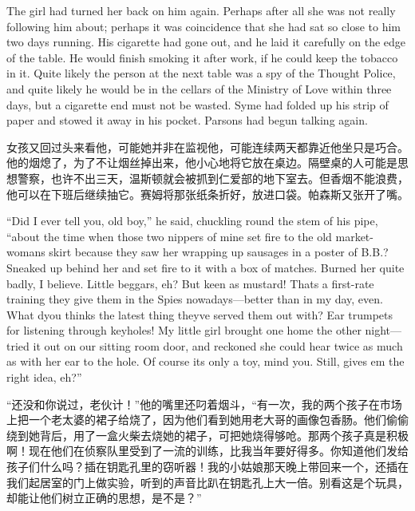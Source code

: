 \begin{paracol}{2}
\switchcolumn*

The girl had turned her back on him again. Perhaps after all she was not
really following him about; perhaps it was coincidence that she had sat
so close to him two days running. His cigarette had gone out, and he
laid it carefully on the edge of the table. He would finish smoking it
after work, if he could keep the tobacco in it. Quite likely the person
at the next table was a spy of the Thought Police, and quite likely he
would be in the cellars of the Ministry of Love within three days, but a
cigarette end must not be wasted. Syme had folded up his strip of paper
and stowed it away in his pocket. Parsons had begun talking again.

\switchcolumn

女孩又回过头来看他，可能她并非在监视他，可能连续两天都靠近他坐只是巧合。他的烟熄了，为了不让烟丝掉出来，他小心地将它放在桌边。隔壁桌的人可能是思想警察，也许不出三天，温斯顿就会被抓到仁爱部的地下室去。但香烟不能浪费，他可以在下班后继续抽它。赛姆将那张纸条折好，放进口袋。帕森斯又张开了嘴。

\switchcolumn*

``Did I ever tell you, old boy,'' he said, chuckling round the stem of his
pipe, ``about the time when those two nippers of mine set fire to the old
market-woman\textquotesingle s skirt because they saw her wrapping up
sausages in a poster of B.B.? Sneaked up behind her and set fire to it
with a box of matches. Burned her quite badly, I believe. Little
beggars, eh? But keen as mustard! That\textquotesingle s a first-rate
training they give them in the Spies nowadays---better than in my day,
even. What d\textquotesingle you think\textquotesingle s the latest
thing they\textquotesingle ve served them out with? Ear trumpets for
listening through keyholes! My little girl brought one home the other
night---tried it out on our sitting room door, and reckoned she could
hear twice as much as with her ear to the hole. Of course
it\textquotesingle s only a toy, mind you. Still, gives
\textquotesingle em the right idea, eh?''

\switchcolumn

``还没和你说过，老伙计！''他的嘴里还叼着烟斗，``有一次，我的两个孩子在市场上把一个老太婆的裙子给烧了，因为他们看到她用老大哥的画像包香肠。他们偷偷绕到她背后，用了一盒火柴去烧她的裙子，可把她烧得够呛。那两个孩子真是积极啊！现在他们在侦察队里受到了一流的训练，比我当年要好得多。你知道他们发给孩子们什么吗？插在钥匙孔里的窃听器！我的小姑娘那天晚上带回来一个，还插在我们起居室的门上做实验，听到的声音比趴在钥匙孔上大一倍。别看这是个玩具，却能让他们树立正确的思想，是不是？''


\end{paracol}
